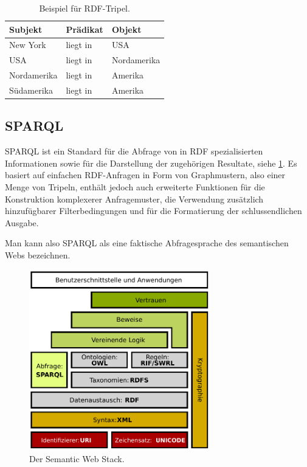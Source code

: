 \documentclass[headsepline,titlepage,ngerman,twoside,12pt]{report}
\begin{document}
\begin{table}
\begin{centering}
\begin{tabularx}{\textwidth}{XXX}
\toprule
\textrm{Subjekt}			&\textrm{Prädikat}			&\textrm{Objekt}\\
\midrule
New York				&liegt in				&USA\\
USA				 		&liegt in				&Nordamerika\\
Nordamerika				&liegt in				&Amerika\\
Südamerika				&liegt in 			&Amerika\\
\bottomrule
\end{tabularx}
\end{centering}
\caption{Beispiel für RDF-Tripel.}
\label{tab:rdfexample}
\end{table}


\subsection{\acs{SPARQL}}
\label{sub:sparql}
\ac{SPARQL} ist ein Standard für die Abfrage von in \ac{RDF} spezialisierten Informationen sowie für die Darstellung der zugehörigen Resultate, siehe \cref{img:semanticwebstack1}.
Es basiert auf einfachen \ac{RDF}-Anfragen in Form von Graphmustern, also einer Menge von Tripeln, enthält jedoch auch erweiterte Funktionen für die Konstruktion komplexerer Anfragemuster, die Verwendung zusätzlich hinzufügbarer Filterbedingungen und für die Formatierung der schlussendlichen Ausgabe.


Man kann also \ac{SPARQL} als eine faktische Abfragesprache des semantischen Webs bezeichnen.
\begin{figure}
\centering
\includegraphics[width=0.7\textwidth]{images/swebstackde.pdf}
\caption{Der Semantic Web Stack.}
\label{img:semanticwebstack1}
\end{figure}
\end{document}

